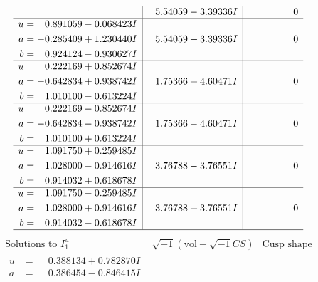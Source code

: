 \documentclass[1p]{elsarticle_modified}
\theoremstyle{definition}
\newcommand{\I}{\sqrt{-1}}
\begin{document}
$$\begin{array}{c|c|c}
 & \phantom{-}5.54059 - 3.39336 I & \phantom{-0.000000 } 0 \\ \hline\begin{aligned}
u &= \phantom{-}0.891059 - 0.068423 I \\
a &= -0.285409 + 1.230440 I \\
b &= \phantom{-}0.924124 - 0.930627 I\end{aligned}
 & \phantom{-}5.54059 + 3.39336 I & \phantom{-0.000000 } 0 \\ \hline\begin{aligned}
u &= \phantom{-}0.222169 + 0.852674 I \\
a &= -0.642834 + 0.938742 I \\
b &= \phantom{-}1.010100 - 0.613224 I\end{aligned}
 & \phantom{-}1.75366 + 4.60471 I & \phantom{-0.000000 } 0 \\ \hline\begin{aligned}
u &= \phantom{-}0.222169 - 0.852674 I \\
a &= -0.642834 - 0.938742 I \\
b &= \phantom{-}1.010100 + 0.613224 I\end{aligned}
 & \phantom{-}1.75366 - 4.60471 I & \phantom{-0.000000 } 0 \\ \hline\begin{aligned}
u &= \phantom{-}1.091750 + 0.259485 I \\
a &= \phantom{-}1.028000 - 0.914616 I \\
b &= \phantom{-}0.914032 + 0.618678 I\end{aligned}
 & \phantom{-}3.76788 - 3.76551 I & \phantom{-0.000000 } 0 \\ \hline\begin{aligned}
u &= \phantom{-}1.091750 - 0.259485 I \\
a &= \phantom{-}1.028000 + 0.914616 I \\
b &= \phantom{-}0.914032 - 0.618678 I\end{aligned}
 & \phantom{-}3.76788 + 3.76551 I & \phantom{-0.000000 } 0\\
 \hline 
 \end{array}$$\newpage$$\begin{array}{c|c|c}  
\text{Solutions to }I^u_{1}& \I (\text{vol} + \sqrt{-1}CS) & \text{Cusp shape}\\
 \hline 
\begin{aligned}
u &= \phantom{-}0.388134 + 0.782870 I \\
a &= \phantom{-}0.386454 - 0.846415 I \\

\end{aligned}
\end{array}$$
\end{document}
